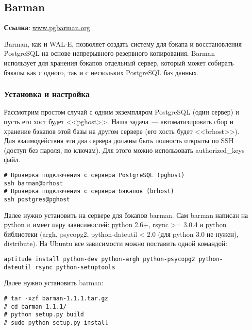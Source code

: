 \subsection{Barman}
\textbf{Ссылка}: \href{http://www.pgbarman.org/}{www.pgbarman.org}

Barman, как и WAL-E, позволяет создать систему для бэкапа и восстановления PostgreSQL на основе непрерывного резервного копирования. Barman использует для хранения бэкапов отдельный сервер, который может собирать бэкапы как с одного, так и с нескольких PostgreSQL баз данных.

\subsubsection{Установка и настройка}

Рассмотрим простом случай с одним экземпляром PostgreSQL (один сервер) и пусть его хост будет <<pghost>>. Наша задача~--- автоматизировать сбор и хранение бэкапов этой базы на другом сервере (его хость будет <<brhost>>). Для взаимодействия эти два сервера должны быть полность открыты по SSH (доступ без пароля, по ключам). Для этого можно использовать authorized\_keys файл.

\begin{lstlisting}[label=lst:barman1,caption=Проверка подключения по SSH]
# Проверка подключения с сервера PostgreSQL (pghost)
ssh barman@brhost
# Проверка подключения с сервера бэкапов (brhost)
ssh postgres@pghost
\end{lstlisting}

Далее нужно установить на сервере для бэкапов barman. Сам barman написан на python и имеет пару зависимостей: python 2.6+, rsync >= 3.0.4 и python библиотеки (argh, psycopg2, python-dateutil < 2.0 (для python 3.0 не нужен), distribute). На Ubuntu все зависимости можно поставить одной командой:

\begin{lstlisting}[label=lst:barman2,caption=Установка зависимостей barman]
aptitude install python-dev python-argh python-psycopg2 python-dateutil rsync python-setuptools
\end{lstlisting}

Далее нужно установить barman:

\begin{lstlisting}[label=lst:barman3,caption=Установка barman]
# tar -xzf barman-1.1.1.tar.gz
# cd barman-1.1.1/
# python setup.py build
# sudo python setup.py install
\end{lstlisting}

